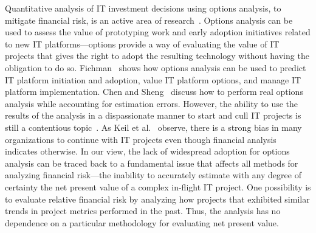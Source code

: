 Quantitative analysis of IT investment decisions using options analysis, to
mitigate financial risk, is an active area of
research~\cite{risk14,risk15,risk16}. Options analysis can be used to assess the
value of prototyping work and early adoption initiatives related to new IT
platforms---options provide a way of evaluating the value of IT projects that
gives the right to adopt the resulting technology without having the obligation
to do so. Fichman~\cite{risk14} shows how options analysis can be used to
predict IT platform initiation and adoption, value IT platform options, and
manage IT platform implementation. Chen and Sheng~\cite{risk15} discuss how to
perform real options analysis while accounting for estimation errors. However,
the ability to use the results of the analysis in a dispassionate manner to
start and cull IT projects is still a contentious topic~\cite{risk17}. As Keil
et al.~\cite{risk18} observe, there is a strong bias in many organizations to
continue with IT projects even though financial analysis indicates otherwise. In
our view, the lack of widespread adoption for options analysis can be traced
back to a fundamental issue that affects all methods for analyzing financial
risk---the inability to accurately estimate with any degree of certainty the net
present value of a complex in-flight IT project. One possibility is to evaluate
relative financial risk by analyzing how projects that exhibited similar trends
in project metrics performed in the past. Thus, the analysis has no dependence
on a particular methodology for evaluating net present value.

